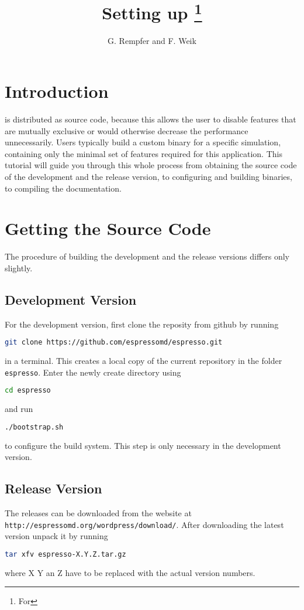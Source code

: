 \documentclass[
paper=a4,                       %
fontsize=11pt,                  %
headinclude=false,              %
footinclude=false,              %
pagesize,                       %
]{scrartcl}
\begin{document}
\esptitlehead

\title{Setting up \es{}
\ifdefined\esversion%
\thanks{For \es \esversion}%
\fi%
}
\author{G. Rempfer and F. Weik}

\maketitle

\section{Introduction}
\es{} is distributed as source code, because this allows the user to disable features that are mutually exclusive or would otherwise decrease the performance unnecessarily. Users typically  build a custom \es{} binary for a specific simulation, containing only the minimal set of features required for this application. This tutorial will guide you through this whole process  from obtaining the source code of the development and the release version, to configuring and building binaries, to compiling the documentation.

\section{Getting the Source Code}
The procedure of building \es{} the development and the release versions differs only slightly.
\subsection{Development Version}
%
For the development version, first clone the \es{} reposity from github by running
\begin{lstlisting}[language=bash]
git clone https://github.com/espressomd/espresso.git
\end{lstlisting}
%
in a terminal. This creates a local copy of the current \es{} repository in the folder \verb!espresso!.
Enter the newly create directory using
\begin{lstlisting}[language=bash]
cd espresso
\end{lstlisting}
and run
\begin{lstlisting}[language=bash]
./bootstrap.sh
\end{lstlisting}
to configure the build system. This step is only necessary in the development version.

\subsection{Release Version}
The \es{} releases can be downloaded from the \es{} website at\\
\verb!http://espressomd.org/wordpress/download/!.
After downloading the latest version unpack it by running
\begin{lstlisting}[language=bash]
  tar xfv espresso-X.Y.Z.tar.gz
\end{lstlisting}
where X Y an Z have to be replaced with the actual version numbers.
\end{document}

